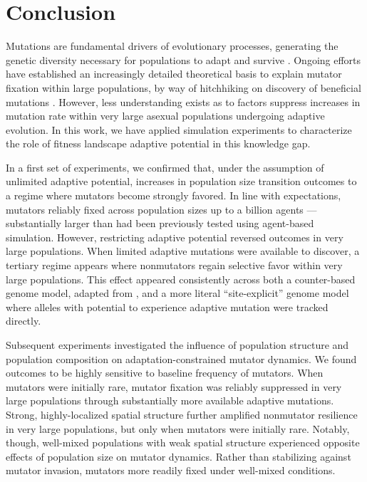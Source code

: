\section{Conclusion} \label{sec:conclusion}

Mutations are fundamental drivers of evolutionary processes, generating the genetic diversity necessary for populations to adapt and survive \citep{hershberg2015mutation}.
Ongoing efforts have established an increasingly detailed theoretical basis to explain mutator fixation within large populations, by way of hitchhiking on discovery of beneficial mutations \citep{raynes2011mutator,raynes2013effect,raynes2018sign,raynes2019selection,raynes2019migration}.
However, less understanding exists as to factors suppress increases in mutation rate within very large asexual populations undergoing adaptive evolution.
In this work, we have applied simulation experiments to characterize the role of fitness landscape adaptive potential in this knowledge gap.

In a first set of experiments, we confirmed that, under the assumption of unlimited adaptive potential, increases in population size transition outcomes to a regime where mutators become strongly favored.
In line with expectations, mutators reliably fixed across population sizes up to a billion agents — substantially larger than had been previously tested using agent-based simulation.
However, restricting adaptive potential reversed outcomes in very large populations.
When limited adaptive mutations were available to discover, a tertiary regime appears where nonmutators regain selective favor within very large populations.
This effect appeared consistently across both a counter-based genome model, adapted from \citet{raynes2018sign}, and a more literal ``site-explicit'' genome model where alleles with potential to experience adaptive mutation were tracked directly.

Subsequent experiments investigated the influence of population structure and population composition on adaptation-constrained mutator dynamics.
We found outcomes to be highly sensitive to baseline frequency of mutators.
When mutators were initially rare, mutator fixation was reliably suppressed in very large populations through substantially more available adaptive mutations.
Strong, highly-localized spatial structure further amplified nonmutator resilience in very large populations, but only when mutators were initially rare.
Notably, though, well-mixed populations with weak spatial structure experienced opposite effects of population size on mutator dynamics.
Rather than stabilizing against mutator invasion, mutators more readily fixed under well-mixed conditions.

